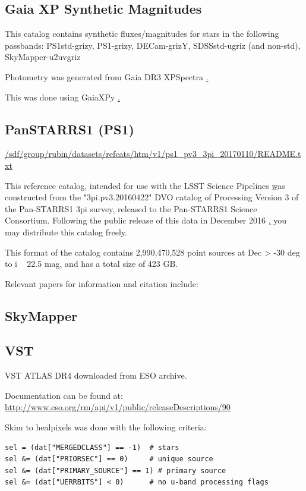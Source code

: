 \subsection{Gaia XP Synthetic Magnitudes}
\label{sec:gaiaxp}
This catalog contains synthetic fluxes/magnitudes for stars in the following passbands:
PS1std-grizy, PS1-grizy, DECam-grizY, SDSSstd-ugriz (and non-std), SkyMapper-u2uvgriz

Photometry was generated from Gaia DR3 XPSpectra \href{https://arxiv.org/abs/2206.06215}. 

This was done using GaiaXPy \href{https://github.com/gaia-dpci/GaiaXPy/cd}.

\subsection{PanSTARRS1 (PS1)}
\label{sec:ps1}
\url{/sdf/group/rubin/datasets/refcats/htm/v1/ps1_pv3_3pi_20170110/README.txt}

This reference catalog, intended for use with the LSST Science Pipelines \href{https://pipelines.lsst.io} was constructed from the "3pi.pv3.20160422" DVO catalog of Processing Version 3 of the Pan-STARRS1 3pi survey, released to the Pan-STARRS1 Science Consortium. Following the public release of this data in December 2016 \href{http://panstarrs.stsci.edu}, you may distribute this catalog freely.

This format of the catalog contains 2,990,470,528 point sources at Dec > -30 deg to i ~ 22.5 mag, and has a total size of 423 GB. 

Relevant papers for information and citation include: \citet{Chambers:2016}

\subsection{SkyMapper}
\label{sec:skymapper}
\subsection{VST}
\label{sec:vst}

VST ATLAS DR4 downloaded from ESO archive.

Documentation can be found at: \url{http://www.eso.org/rm/api/v1/public/releaseDescriptions/90}

Skim to healpixels was done with the following criteria:
\begin{verbatim}
sel = (dat["MERGEDCLASS"] == -1)  # stars
sel &= (dat["PRIORSEC"] == 0)     # unique source 
sel &= (dat["PRIMARY_SOURCE"] == 1) # primary source 
sel &= (dat["UERRBITS"] < 0)      # no u-band processing flags
\end{verbatim}

